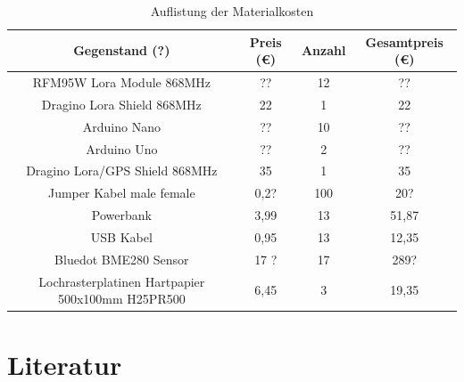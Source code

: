 \documentclass[a4paper,11pt,DIV=calc,tablecaptionabove,headinclude,twoside]{article}
\begin{document}
\begin{table}[h]
\label{Kosten}
\caption{Auflistung der Materialkosten}
\begin{tabular}{|c|c|c|c|}
\hline
Gegenstand (?) & Preis (\euro) & Anzahl & Gesamtpreis (\euro) \\\hline \hline
RFM95W Lora Module 868MHz  & ?? & 12 & ?? \\\hline
Dragino Lora Shield 868MHz & 22 & 1 & 22 \\\hline
Arduino Nano & ?? & 10 & ?? \\\hline
Arduino Uno & ?? & 2 & ?? \\\hline
Dragino Lora/GPS Shield 868MHz & 35 & 1 & 35 \\\hline
Jumper Kabel male female & 0,2? & 100 & 20? \\\hline
Powerbank & 3,99 & 13 & 51,87 \\\hline
USB Kabel & 0,95 & 13 & 12,35 \\\hline
Bluedot BME280 Sensor & 17 ? & 17 & 289? \\\hline
Lochrasterplatinen Hartpapier 500x100mm H25PR500 & 6,45 & 3 & 19,35 \\\hline
\end{tabular}
\label{Tab:Kosten}
\end{table}


\section*{Literatur}

\end{document}
